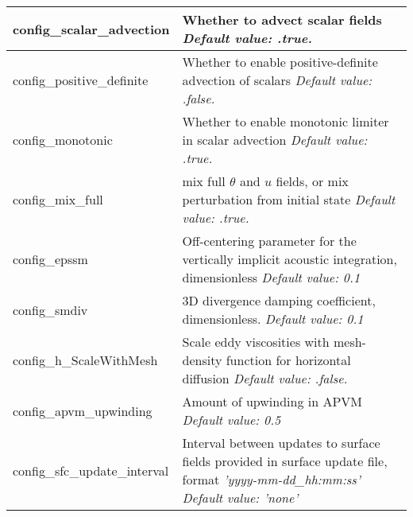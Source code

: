 {\begin{longtable}{|p{1.75in} |p{4.5in}|}
   config\_scalar\_advection & Whether to advect scalar fields \newline 
   {\em Default value: .true.} \\ \hline   

   config\_positive\_definite & Whether to enable positive-definite advection of scalars \newline 
   {\em Default value: .false.} \\ \hline

   config\_monotonic & Whether to enable monotonic limiter in scalar advection \newline 
   {\em Default value: .true.} \\ \hline

   config\_mix\_full & mix full $\theta$ and $u$ fields, or mix perturbation from initial state \newline 
   {\em Default value: .true.} \\ \hline   
      
   config\_epssm & Off-centering parameter for the vertically implicit acoustic \hfill \break integration, dimensionless \newline 
   {\em Default value: 0.1} \\ \hline

   config\_smdiv & 3D divergence damping coefficient, dimensionless. \newline 
   {\em Default value: 0.1} \\ \hline

   config\_h\_ScaleWithMesh & Scale eddy viscosities with mesh-density function for horizontal diffusion \newline 
   {\em Default value: .false.} \\ \hline
   
   config\_apvm\_upwinding & Amount of upwinding in APVM \newline 
   {\em Default value: 0.5} \\ \hline   

   config\_sfc\_update\_interval & Interval between updates to surface fields provided in surface update file, 
   format {\em 'yyyy-mm-dd\_hh:mm:ss'} \newline 
   {\em Default value: 'none'} \\ \hline

\end{longtable}
}

